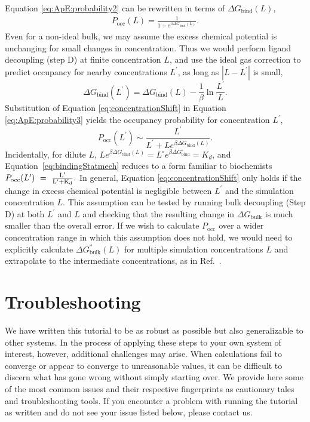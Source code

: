 \documentclass[9pt,tutorial,pubversion]{Styling/livecoms}
\begin{document}
Equation \ref{eq:ApE:probability2} can be rewritten in terms of $\Delta G_\mathrm{bind}(L)$,  
\begin{align}
 P_\mathrm{occ}(L) = \frac{1}{1+e^{\beta \Delta G_\mathrm{bind}(L)}} \label{eq:ApE:probability3}.
\end{align}
Even for a non-ideal bulk, we may assume the excess chemical potential is unchanging for small changes in concentration. Thus we would perform ligand decoupling (step D) at finite concentration $L$, and use the ideal gas correction to predict occupancy for nearby concentrations $L^\prime$, as long as $|L-L^\prime|$ is small,
\begin{equation}
\label{eq:concentrationShift}
    \Delta G_\mathrm{bind}(L^\prime)= \Delta G_\mathrm{bind}(L)-\frac{1}{\beta} \ln \frac{L^\prime}{L}.
\end{equation}
Substitution of Equation \ref{eq:concentrationShift} in Equation \ref{eq:ApE:probability3} yields the occupancy probability for concentration $L^\prime$,
\begin{equation}\label{eq:bindingStatmech}
    P_\mathrm{occ}(L^\prime)\sim\frac{L^\prime}{L^\prime+{L}e^{\beta \Delta G_\mathrm{bind}(L)}}.
    \end{equation} 
Incidentally, for dilute $L$, ${L}e^{\beta \Delta G_\mathrm{bind}(L)}={L^\circ}e^{\beta \Delta G^\circ_\mathrm{bind}}=K_d$,
and Equation~\ref{eq:bindingStatmech} reduces to  a form familiar to biochemists 
$
    P_\mathrm{occ}(L^\prime)~=~\rm\frac{L^\prime}{L^\prime+K_d}.
$
In general, Equation \ref{eq:concentrationShift} only holds if the change in excess chemical potential is negligible between $L^\prime$ and the simulation concentration $L$.
This assumption can be tested by running bulk decoupling (Step D) at both $L^\prime$ and $L$ and checking that the resulting change in $\Delta G_\mathrm{bulk}$ is much smaller than the overall error. If we wish to calculate $P_\mathrm{occ}$ over a wider concentration range in which this assumption does not hold, we would need to explicitly calculate $\Delta G^*_\mathrm{bulk}(L)$ for multiple simulation concentrations $L$ and extrapolate to the intermediate concentrations, as in Ref.~.


\section{Troubleshooting}
\label{app:troubleshooting}
We have written this tutorial to be as robust as possible but also generalizable to other systems.
In the process of applying these steps to your own system of interest, however, additional challenges may arise.
When calculations fail to converge or appear to converge to unreasonable values, it can be difficult to discern what has gone wrong without simply starting over. 
We provide here some of the most common issues and their respective fingerprints as cautionary tales and troubleshooting tools.
If you encounter a problem with running the tutorial as written and do not see your issue listed below, please contact us.
\end{document}

